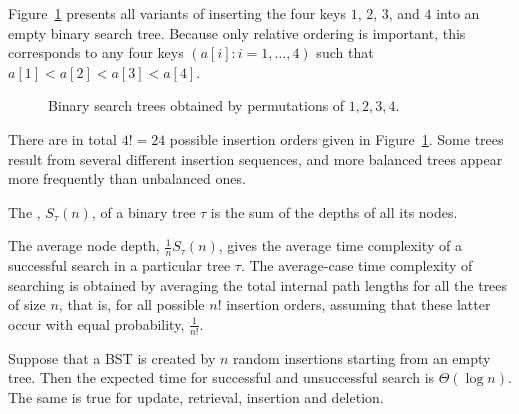 Figure~\ref{btr-4b} presents all variants of inserting the four 
keys $1$, $2$, $3$, and $4$ into an empty binary search tree. Because only 
relative ordering is important, this corresponds to any four keys 
\((a[i]: i=1,\ldots,4)\) such that
\(
a[1] < a[2] < a[3] < a[4]
\).

\begin{figure}[htb!]
\centerline{
}
\centerline{
}
\caption{\label{btr-4b} Binary search trees obtained by
permutations of $1,2,3,4$.}
\end{figure}

There are in total $4!=24$ possible insertion orders given in
Figure~\ref{btr-4b}.
Some trees result from several different insertion sequences, and more balanced 
trees appear more frequently than unbalanced ones.


\begin{Definition}
The , 
\(S_\tau(n)\), of a binary tree $\tau$  is the sum of the 
depths of all its nodes. 
\end{Definition}

The average node depth, \(\frac{1}{n}S_{\tau}(n)\),
gives the average time complexity of a successful search in a
particular tree $\tau$. The average-case time complexity of searching
is obtained by averaging the total internal path lengths for all the trees of 
size \(n\), that is, for all possible \(n!\) insertion orders, assuming that 
these latter occur with equal probability, \(\frac{1}{n!}\). 


\begin{Lemma}\label{lem:bst:ave}
Suppose that a BST is created by $n$ random insertions starting from an empty tree.
Then the expected time for successful and unsuccessful search is 
$\Theta(\log n)$. The same is true for update, retrieval, insertion and deletion.
\end{Lemma}

